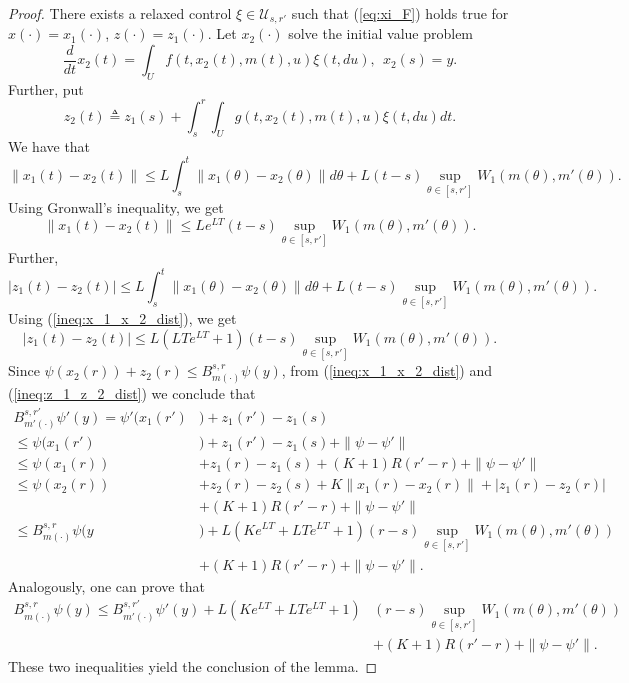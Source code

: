 \documentclass[a4paper,12pt]{article}
\begin{document}
\begin{proof}
	There exists a relaxed control $\xi\in\mathcal{U}_{s,r'}$ such that (\ref{eq:xi_F}) holds true for $x(\cdot)=x_1(\cdot)$, $z(\cdot)=z_1(\cdot)$. Let $x_2(\cdot)$ solve the initial value problem
	$$ \frac{d}{dt}x_2(t)=\int_U f(t,x_2(t),m(t),u)\xi(t,du),\ \ x_2(s)=y.$$ Further, put
	$$z_2(t)\triangleq z_1(s)+\int_s^r\int_U g(t,x_2(t),m(t),u)\xi(t,du)dt. $$
	We have that
	$$\|x_1(t)-x_2(t)\|\leq L\int_s^t\|x_1(\theta)-x_2(\theta)\|d\theta+L(t-s)\sup_{\theta\in [s,r']}W_1(m(\theta),m'(\theta)). $$
	Using Gronwall's inequality, we get
	\begin{equation}\label{ineq:x_1_x_2_dist}
	\|x_1(t)-x_2(t)\|\leq Le^{LT}(t-s)\sup_{\theta\in [s,r']}W_1(m(\theta),m'(\theta)).
	\end{equation}
	Further,
	$$|z_1(t)-z_2(t)|\leq L\int_s^t\|x_1(\theta)-x_2(\theta)\|d\theta+L(t-s)\sup_{\theta\in [s,r']}W_1(m(\theta),m'(\theta)).  $$ Using (\ref{ineq:x_1_x_2_dist}), we get
	\begin{equation}\label{ineq:z_1_z_2_dist}
	|z_1(t)-z_2(t)|\leq L(LTe^{LT}+1)(t-s)\sup_{\theta\in [s,r']}W_1(m(\theta),m'(\theta)).
	\end{equation}	
	Since $\psi(x_2(r))+z_2(r)\leq B^{s,r}_{m(\cdot)}\psi(y)$, from (\ref{ineq:x_1_x_2_dist}) and (\ref{ineq:z_1_z_2_dist})   we conclude that
	\begin{equation*}
	\begin{split}
	B^{s,r'}_{m'(\cdot)}\psi'(y)=\psi'(x_1(r')&)+z_1(r')-z_1(s)
	\\ \leq \psi(x_1(r')&)+z_1(r')-z_1(s)+\|\psi-\psi'\|\\ \leq \psi(x_1(r))&+z_1(r)-z_1(s)+(K+1)R(r'-r)+\|\psi-\psi'\|
	\\\leq
	\psi(x_2(r))&+z_2(r)-z_2(s)+K\|x_1(r)-x_2(r)\|+|z_1(r)-z_2(r)|\\&+(K+1)R(r'-r)+\|\psi-\psi'\|\\ 
	\leq
	B^{s,r}_{m(\cdot)}\psi(y&) +L(Ke^{LT}+LTe^{LT}+1)(r-s)\sup_{\theta\in [s,r']}W_1(m(\theta),m'(\theta))\\&+(K+1)R(r'-r)+\|\psi-\psi'\|.
	\end{split}
	\end{equation*}
	Analogously, one can prove that
	\begin{equation*}
	\begin{split}
	B^{s,r}_{m(\cdot)}\psi(y)\leq
	B^{s,r'}_{m'(\cdot)}\psi'(y)+L(Ke^{LT}+LTe^{LT}+1)&(r-s)\sup_{\theta\in [s,r']}W_1(m(\theta),m'(\theta))\\&+(K+1)R(r'-r)+\|\psi-\psi'\|.
	\end{split}
	\end{equation*}	  These two inequalities yield the conclusion of the lemma.
\end{proof}
\end{document}
